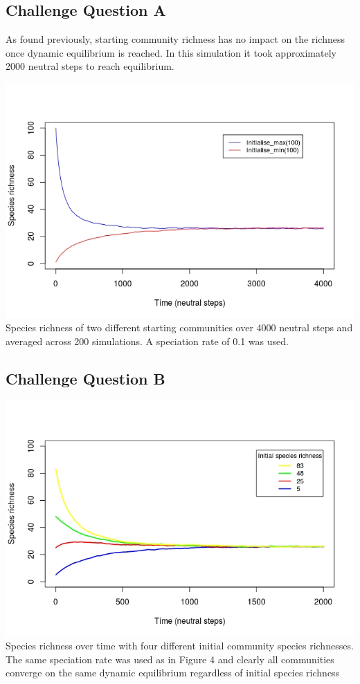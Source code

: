\documentclass{article}
\begin{document}
\break

\subsection*{Challenge Question A}
As found previously, starting community richness has no impact on the richness once
dynamic equilibrium is reached. In this simulation it took approximately 2000 neutral
steps to reach equilibrium.

\begin{center}
  \includegraphics[width=\textwidth]{../Results/challenge_A.jpeg}
   {Species richness of two different starting communities over
  4000 neutral steps and averaged across 200 simulations. A speciation rate of 0.1 was
  used.}
\end{center}

\subsection*{Challenge Question B}

\begin{center}
  \includegraphics[width=\textwidth]{../Results/challenge_B.jpeg}
   {Species richness over time with four different initial 
  community species richnesses. The same speciation rate was used as in Figure 4
  and clearly all communities converge on the same dynamic equilibrium regardless 
  of initial species richness}
\end{center}
\end{document}
